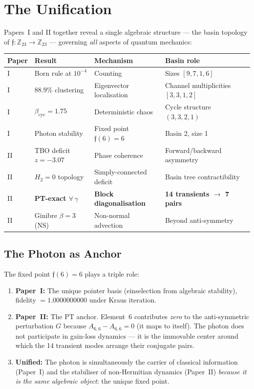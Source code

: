 \documentclass[12pt,a4paper]{article}
\theoremstyle{definition}
\theoremstyle{remark}
\newcommand{\Reeds}{\mathfrak{f}}
\newcommand{\Zp}{\mathbb{Z}_{23}}
\begin{document}
\section{The Unification}
\label{sec:unification}

Papers~I and II together reveal a single algebraic structure --- the basin
topology of $\Reeds: \Zp \to \Zp$ --- governing \emph{all} aspects of quantum
mechanics:

\begin{center}
\begin{tabular}{llll}
\toprule
\textbf{Paper} & \textbf{Result} & \textbf{Mechanism} & \textbf{Basin role} \\
\midrule
I & Born rule at $10^{-4}$ & Counting & Sizes $[9,7,1,6]$ \\
I & $88.9\%$ clustering & Eigenvector localisation & Channel multiplicities $[3,3,1,2]$ \\
I & $\beta_{\text{cyc}} = 1.75$ & Deterministic chaos & Cycle structure $(3,3,2,1)$ \\
I & Photon stability & Fixed point $\Reeds(6) = 6$ & Basin 2, size 1 \\
II & TBO deficit $z = -3.07$ & Phase coherence & Forward/backward asymmetry \\
II & $H_2 = 0$ topology & Simply-connected deficit & Basin tree contractibility \\
II & \textbf{PT-exact $\forall\,\gamma$} & \textbf{Block diagonalisation} & \textbf{14 transients $\to$ 7 pairs} \\
II & Ginibre $\beta = 3$ (NS) & Non-normal advection & Beyond anti-symmetry \\
\bottomrule
\end{tabular}
\end{center}

\subsection{The Photon as Anchor}

The fixed point $\Reeds(6) = 6$ plays a triple role:
\begin{enumerate}
  \item \textbf{Paper~I:} The unique pointer basis (einselection from algebraic
  stability), fidelity $= 1.0000000000$ under Kraus iteration.
  \item \textbf{Paper~II:} The PT anchor. Element~6 contributes \emph{zero} to
  the anti-symmetric perturbation $G$ because $A_{6,6} - A_{6,6} = 0$ (it maps
  to itself). The photon does not participate in gain-loss dynamics --- it is the
  immovable center around which the 14 transient modes arrange their conjugate
  pairs.
  \item \textbf{Unified:} The photon is simultaneously the carrier of classical
  information (Paper~I) and the stabiliser of non-Hermitian dynamics (Paper~II)
  \emph{because it is the same algebraic object}: the unique fixed point.
\end{enumerate}
\end{document}
